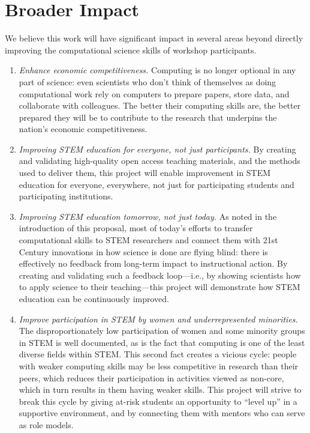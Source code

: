 \documentclass{proposalnsf}
\newlength{\up}
\begin{document}
\section{Broader Impact}

We believe this work will have significant impact in several areas
beyond directly improving the computational science skills of workshop
participants.

\begin{enumerate}

\item
  \emph{Enhance economic competitiveness.} Computing is no longer
  optional in any part of science: even scientists who don't think of
  themselves as doing computational work rely on computers to prepare
  papers, store data, and collaborate with colleagues.  The better
  their computing skills are, the better prepared they will be to
  contribute to the research that underpins the nation's economic
  competitiveness.

\item
  \emph{Improving STEM education for everyone, not just participants.}
  By creating and validating high-quality open access teaching
  materials, and the methods used to deliver them, this project will
  enable improvement in STEM education for everyone, everywhere, not
  just for participating students and participating institutions.

\item
  \emph{Improving STEM education tomorrow, not just today.}  As noted
  in the introduction of this proposal, most of today's efforts to
  transfer computational skills to STEM researchers and connect them
  with 21st Century innovations in how science is done are flying
  blind: there is effectively no feedback from long-term impact to
  instructional action.  By creating and validating such a feedback
  loop---i.e., by showing scientists how to apply science to their
  teaching---this project will demonstrate how STEM education can be
  continuously improved.

\item
  \emph{Improve participation in STEM by women and underrepresented
    minorities.} The disproportionately low participation of women and
  some minority groups in STEM is well documented, as is the fact that
  computing is one of the least diverse fields within STEM.  This
  second fact creates a vicious cycle: people with weaker computing
  skills may be less competitive in research than their peers, which
  reduces their participation in activities viewed as non-core, which
  in turn results in them having weaker skills.  This project will
  strive to break this cycle by giving at-risk students an opportunity
  to ``level up'' in a supportive environment, and by connecting them
  with mentors who can serve as role models.

\end{enumerate}
\end{document}
